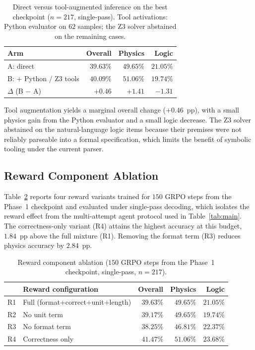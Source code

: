 \documentclass[preprint,12pt]{elsarticle}
\begin{document}
\begin{table}[t]
\centering
\caption{Direct versus tool-augmented inference on the best checkpoint
         ($n=217$, single-pass). Tool activations: Python evaluator on
         $62$ samples; the Z3 solver abstained on the remaining cases.}
\label{tab:tool}
\begin{tabular}{lrrr}
\toprule
Arm & Overall & Physics & Logic \\
\midrule
A: direct                 & $39.63\%$ & $49.65\%$ & $21.05\%$ \\
B: $+$ Python / Z3 tools  & $40.09\%$ & $51.06\%$ & $19.74\%$ \\
\midrule
$\Delta$ (B $-$ A)        & $+0.46$   & $+1.41$   & $-1.31$ \\
\bottomrule
\end{tabular}
\end{table}

Tool augmentation yields a marginal overall change ($+0.46$~pp), with a small
physics gain from the Python evaluator and a small logic decrease. The Z3
solver abstained on the natural-language logic items because their premises
were not reliably parseable into a formal specification, which limits the
benefit of symbolic tooling under the current parser.

\subsection{Reward Component Ablation}
Table~\ref{tab:reward} reports four reward variants trained for $150$ GRPO
steps from the Phase~1 checkpoint and evaluated under single-pass decoding,
which isolates the reward effect from the multi-attempt agent protocol used
in Table~\ref{tab:main}. The correctness-only variant (R4) attains the
highest accuracy at this budget, $1.84$~pp above the full mixture (R1).
Removing the format term (R3) reduces physics accuracy by $2.84$~pp.

\begin{table}[t]
\centering
\caption{Reward component ablation ($150$ GRPO steps from the Phase~1
         checkpoint, single-pass, $n=217$).}
\label{tab:reward}
\begin{tabular}{llrrr}
\toprule
& Reward configuration & Overall & Physics & Logic \\
\midrule
R1 & Full (format$+$correct$+$unit$+$length) & $39.63\%$ & $49.65\%$ & $21.05\%$ \\
R2 & No unit term                            & $39.17\%$ & $49.65\%$ & $19.74\%$ \\
R3 & No format term                          & $38.25\%$ & $46.81\%$ & $22.37\%$ \\
R4 & Correctness only                        & $\mathbf{41.47\%}$ & $\mathbf{51.06\%}$ & $23.68\%$ \\
\bottomrule
\end{tabular}
\end{table}
\end{document}
